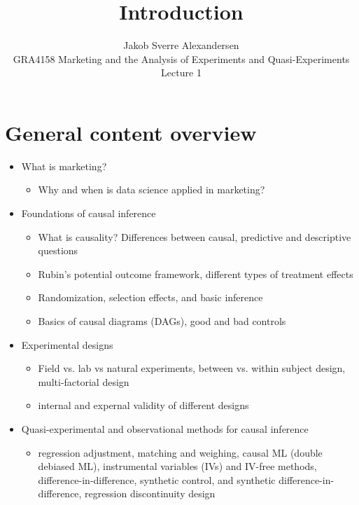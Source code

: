 \documentclass[10pt]{article}
\begin{document}
 
\title{Introduction}
\author{Jakob Sverre Alexandersen\\
GRA4158 Marketing and the Analysis of Experiments and Quasi-Experiments\\
Lecture 1}
\maketitle

\tableofcontents
\newpage
\section{General content overview}
\begin{itemize}
    \item What is marketing?
    \begin{itemize}
        \item Why and when is data science applied in marketing?
    \end{itemize}
    \item Foundations of causal inference
    \begin{itemize}
        \item What is causality? Differences between causal, predictive and descriptive questions 
        \item Rubin's potential outcome framework, different types of treatment effects 
        \item Randomization, selection effects, and basic inference 
        \item Basics of causal diagrams (DAGs), good and bad controls 
    \end{itemize}
    \item Experimental designs 
    \begin{itemize}
        \item Field vs. lab vs natural experiments, between vs. within subject design, multi-factorial design 
        \item internal and expernal validity of different designs
    \end{itemize}
    \item Quasi-experimental and observational methods for causal inference
    \begin{itemize}
        \item regression adjustment, matching and weighing, causal ML (double debiased ML), instrumental variables (IVs) and IV-free methods, difference-in-difference, synthetic control, and synthetic difference-in-difference, regression discontinuity design
    \end{itemize}
\end{itemize}
\end{document}
